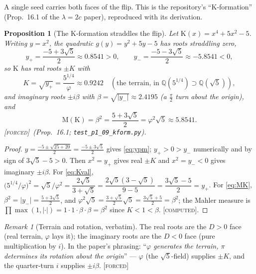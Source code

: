 \documentclass[11pt]{article}
\theoremstyle{plain}
\newtheorem{proposition}[theorem]{Proposition}
\theoremstyle{definition}
\theoremstyle{remark}
\newtheorem{remark}[theorem]{Remark}
\newcommand{\forced}{\textup{\textcolor{forcedc}{\textsc{[forced]}}}}
\newcommand{\computed}{\textup{\textcolor{forcedc}{\textsc{[computed]}}}}
\newcommand{\Q}{\mathbb{Q}}
\newcommand{\Mah}{\mathrm{M}}
\newcommand{\abs}[1]{\left\lvert #1 \right\rvert}
\newcommand{\Kf}{\mathrm{K}}
\begin{document}
A single seed carries both faces of the flip. This is the repository's ``$\Kf$-formation'' (Prop.~16.1 of
the $\lambda=2c$ paper), reproduced with its derivation.

\begin{proposition}[The $\Kf$-formation straddles the flip]\label{prop:kform}
Let $\Kf(x)=x^4+5x^2-5$. Writing $y=x^2$, the quadratic $g(y)=y^2+5y-5$ has roots straddling zero,
\begin{equation}\label{eq:ypm}
y_+=\frac{-5+3\sqrt5}{2}\approx0.8541>0,\qquad y_-=\frac{-5-3\sqrt5}{2}\approx-5.8541<0,
\end{equation}
so $\Kf$ has \emph{real roots} $\pm K$ with
\begin{equation}\label{eq:Kval}
K=\sqrt{y_+}=\frac{5^{1/4}}{\varphi}\approx0.9242\quad(\text{the terrain, in }\Q(5^{1/4})\supset\Q(\sqrt5)),
\end{equation}
and \emph{imaginary roots} $\pm i\beta$ with $\beta=\sqrt{\abs{y_-}}\approx2.4195$ (\emph{a $\tfrac{\pi}{2}$
turn about the origin}), and
\begin{equation}\label{eq:MK}
\Mah(\Kf)=\beta^2=\frac{5+3\sqrt5}{2}=\varphi^2\sqrt5\approx5.8541.
\end{equation}
\forced\ (Prop.~16.1; \texttt{test\_p1\_09\_kform.py}).
\end{proposition}
\begin{proof}
$y=\tfrac{-5\pm\sqrt{25+20}}{2}=\tfrac{-5\pm3\sqrt5}{2}$ gives \eqref{eq:ypm}; $y_+>0>y_-$ numerically and by
sign of $3\sqrt5-5>0$. Then $x^2=y_+$ gives real $\pm K$ and $x^2=y_-<0$ gives imaginary $\pm i\beta$. For
\eqref{eq:Kval}, $\bigl(5^{1/4}/\varphi\bigr)^2=\sqrt5/\varphi^2=\dfrac{2\sqrt5}{3+\sqrt5}
=\dfrac{2\sqrt5(3-\sqrt5)}{9-5}=\dfrac{3\sqrt5-5}{2}=y_+$. For \eqref{eq:MK},
$\beta^2=\abs{y_-}=\tfrac{5+3\sqrt5}{2}$, and $\varphi^2\sqrt5=\tfrac{3+\sqrt5}{2}\sqrt5=\tfrac{3\sqrt5+5}{2}=\beta^2$;
the Mahler measure is $\prod\max(1,\abs\cdot)=1\cdot1\cdot\beta\cdot\beta=\beta^2$ since $K<1<\beta$. \computed.
\end{proof}

\begin{remark}[Terrain and rotation, verbatim]\label{rem:terrain}
The real roots are the $D>0$ face (real terrain, $\varphi$ lays it); the imaginary roots are the $D<0$ face
(pure multiplication by $i$). In the paper's phrasing: ``\emph{$\varphi$ generates the terrain, $\pi$ determines
its rotation about the origin}'' --- $\varphi$ (the $\sqrt5$-field) supplies $\pm K$, and the quarter-turn $i$
supplies $\pm i\beta$. \forced
\end{remark}
\end{document}
